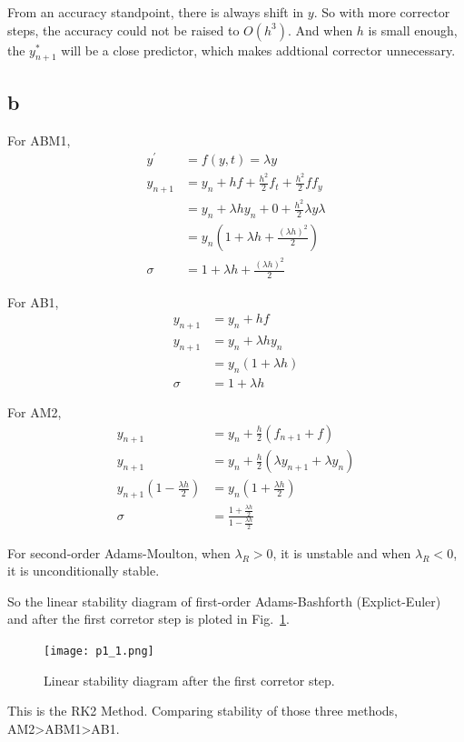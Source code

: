 \documentclass[letterpaper,10pt]{article}
\begin{document}
From an accuracy standpoint, there is always shift in $y$. So with more corrector steps, the accuracy could not be raised to $O(h^3)$. And when $h$ is small enough, the $y^*_{n+1}$ 
will be a close predictor, which makes addtional corrector unnecessary. 

\subsection{b}
For ABM1, 
\begin{align*}
  y^{'}&=f(y,t)=\lambda y\\
  y_{n+1}&=y_n+hf+\frac{h^2}{2}f_t+\frac{h^2}{2}ff_y\\
  &=y_n+\lambda h y_n+0+\frac{h^2}{2}\lambda y \lambda\\
  &=y_n\left(1+\lambda h+\frac{(\lambda h)^2}{2}\right)\\
  \sigma&=1+\lambda h+\frac{(\lambda h)^2}{2}
\end{align*}

For AB1, 
\begin{align*}
  y_{n+1}&=y_n+hf\\
  y_{n+1}&=y_n+\lambda h y_n\\
  &=y_{n}\left(1+\lambda h\right)\\
  \sigma &= 1+\lambda h
\end{align*}

For AM2, 
\begin{align*}
  y_{n+1}&=y_n+\frac{h}{2}\left(f_{n+1}+f\right)\\
  y_{n+1}&=y_n+\frac{h}{2}\left(\lambda y_{n+1}+\lambda y_n\right)\\
  y_{n+1}\left(1-\frac{\lambda h}{2}\right)&=y_n\left(1+\frac{\lambda h}{2}\right)\\
  \sigma &=\frac{1+\frac{\lambda h}{2}}{1-\frac{\lambda h}{2}}
\end{align*}

For second-order Adams-Moulton, when $\lambda_R>0$, it is unstable and when $\lambda_R<0$, it is unconditionally stable. 

So the linear stability diagram of first-order Adams-Bashforth (Explict-Euler) and 
after the first corretor step is ploted in Fig.~\ref{fig1_1}. 
\begin{figure}[h]
  \centering
  \texttt{[image: p1\_1.png]}
  \caption{Linear stability diagram after the first corretor step. }
  \label{fig1_1}
\end{figure}

This is the RK2 Method. Comparing stability of those three methods, AM2>ABM1>AB1. 
\end{document}
